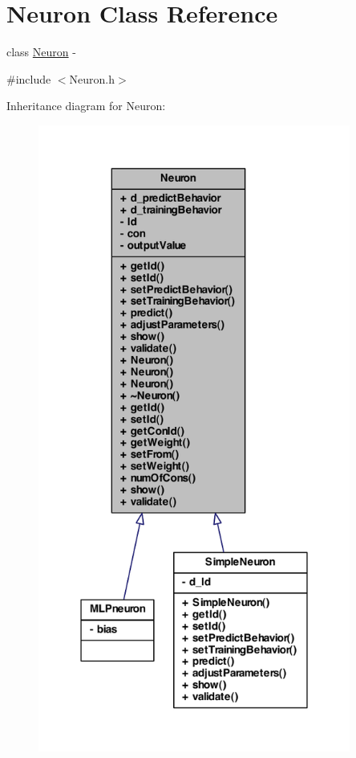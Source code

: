 \hypertarget{class_neuron}{
\section{Neuron Class Reference}
\label{class_neuron}
}


class \hyperlink{class_neuron}{Neuron} -\/  




{\ttfamily \#include $<$Neuron.h$>$}



Inheritance diagram for Neuron:
\nopagebreak
\begin{figure}[H]
\begin{center}
\leavevmode
\includegraphics[width=291pt]{class_neuron__inherit__graph}
\end{center}
\end{figure}


